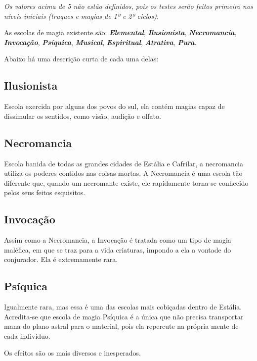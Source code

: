 \documentclass{RPG_Adventure}[2021/10/20]
\begin{document}
\textit{Os valores acima de 5 não estão definidos, pois os testes serão feitos
primeiro nos níveis iniciais (truques e magias de 1º e 2º ciclos).}

As escolas de magia existente são: \textbf{\textit{Elemental}},
\textbf{\textit{Ilusionista}}, \textbf{\textit{Necromancia}},
\textbf{\textit{Invocação}}, \textbf{\textit{Psíquica}},
\textbf{\textit{Musical}}, \textbf{\textit{Espiritual}},
\textbf{\textit{Atrativa}}, \textbf{\textit{Pura}}.

Abaixo há uma descrição curta de cada uma delas:

\subsection*{Ilusionista}%
\label{sub:ilusionista}

Escola exercida por alguns dos povos do sul, ela contém magias capaz de
dissimular os sentidos, como visão, audição e olfato.

\subsection*{Necromancia}%
\label{sub:necromancia}

Escola banida de todas as grandes cidades de Estália e Cafrilar, a necromancia
utiliza os poderes contidos nas coisas mortas. A Necromancia é uma escola tão
diferente que, quando um necromante existe, ele rapidamente torna-se conhecido
pelos seus feitos esquisitos.

\subsection*{Invocação}%
\label{sub:invocacao}

Assim como a Necromancia, a Invocação é tratada como um tipo de magia maléfica,
em que se traz para a vida criaturas, impondo a ela a vontade do conjurador. Ela
é extremamente rara.

\subsection*{Psíquica}%
\label{sub:psiquica}

Igualmente rara, mas essa é uma das escolas mais cobiçadas dentro de Estália.
Acredita-se que escola de magia Psíquica é a única que não precisa transportar
mana do plano astral para o material, pois ela repercute na própria mente de
cada indivíduo.

Os efeitos são os mais diversos e inesperados.
\end{document}
